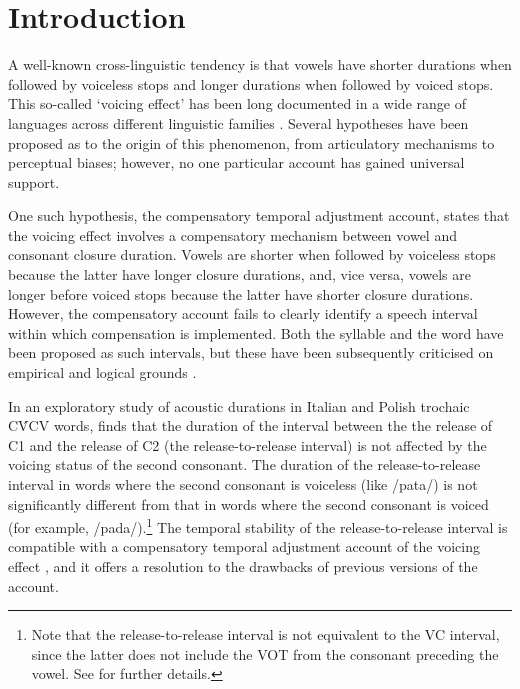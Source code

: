 \documentclass[12pt,a4paper,]{article}
\begin{document}
\hypertarget{introduction}{%
\section{Introduction}\label{introduction}}

\label{s:intro}

A well-known cross-linguistic tendency is that vowels have shorter
durations when followed by voiceless stops and longer durations when
followed by voiced stops. This so-called `voicing effect' has been long
documented in a wide range of languages across different linguistic
families \citep{maddieson1976, begus2017}. Several hypotheses have been
proposed as to the origin of this phenomenon, from articulatory
mechanisms to perceptual biases; however, no one particular account has
gained universal support.

One such hypothesis, the compensatory temporal adjustment account,
states that the voicing effect involves a compensatory mechanism between
vowel and consonant closure duration. Vowels are shorter when followed
by voiceless stops because the latter have longer closure durations,
and, vice versa, vowels are longer before voiced stops because the
latter have shorter closure durations. However, the compensatory account
fails to clearly identify a speech interval within which compensation is
implemented. Both the syllable \citep{lindblom1967, farnetani1986} and
the word \citep{slis1969a, slis1969b, lehiste1970a, lehiste1970b} have
been proposed as such intervals, but these have been subsequently
criticised on empirical and logical grounds
\citep{chen1970, jacewicz2009, maddieson1976, coretta2019k}.

In an exploratory study of acoustic durations in Italian and Polish
trochaic CV́CV words, \citet{coretta2019k} finds that the duration of the
interval between the the release of C1 and the release of C2 (the
release-to-release interval) is not affected by the voicing status of
the second consonant. The duration of the release-to-release interval in
words where the second consonant is voiceless (like /pata/) is not
significantly different from that in words where the second consonant is
voiced (for example,
/pada/).\footnote{Note that the release-to-release interval is not equivalent to the VC interval, since the latter does not include the VOT from the consonant preceding the vowel. See \citet{coretta2019k} for further details.}
The temporal stability of the release-to-release interval is compatible
with a compensatory temporal adjustment account of the voicing effect
\citep{lindblom1967, slis1969a, slis1969b, lehiste1970a, lehiste1970b},
and it offers a resolution to the drawbacks of previous versions of the
account.
\end{document}
